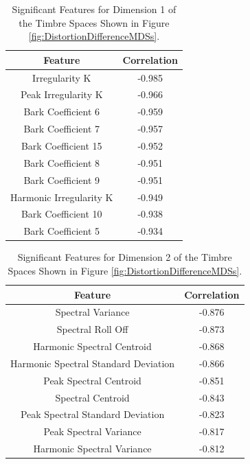	\begin{table}[h!]
		\centering
		\begin{tabular}{|c|c|}
			\hline
			\bf{Feature} & \bf{Correlation} \\
			\hline
			\hline
			Irregularity K & -0.985 \\
			\hline
			Peak Irregularity K & -0.966 \\
			\hline
			Bark Coefficient 6 & -0.959 \\
			\hline
			Bark Coefficient 7 & -0.957 \\
			\hline
			Bark Coefficient 15 & -0.952 \\
			\hline
			Bark Coefficient 8 & -0.951 \\
			\hline
			Bark Coefficient 9 & -0.951 \\
			\hline
			Harmonic Irregularity K & -0.949 \\
			\hline
			Bark Coefficient 10 & -0.938 \\
			\hline
			Bark Coefficient 5 & -0.934 \\
			\hline
		\end{tabular}
		\caption{Significant Features for Dimension 1 of the Timbre Spaces Shown in Figure 
			 \ref{fig:DistortionDifferenceMDSs}.}
		\label{tab:DistortionDifferenceFeatures}
	\end{table}

	\begin{table}[h!]
		\centering
		\begin{tabular}{|c|c|}
			\hline
			\bf{Feature} & \bf{Correlation} \\
			\hline
			\hline
			Spectral Variance & -0.876 \\
			\hline
			Spectral Roll Off & -0.873 \\
			\hline
			Harmonic Spectral Centroid & -0.868 \\
			\hline
			Harmonic Spectral Standard Deviation & -0.866 \\
			\hline
			Peak Spectral Centroid & -0.851 \\
			\hline
			Spectral Centroid & -0.843 \\
			\hline
			Peak Spectral Standard Deviation & -0.823 \\
			\hline
			Peak Spectral Variance & -0.817 \\
			\hline
			Harmonic Spectral Variance & -0.812 \\
			\hline
		\end{tabular}
		\caption{Significant Features for Dimension 2 of the Timbre Spaces Shown in Figure 
			 \ref{fig:DistortionDifferenceMDSs}.}
		\label{tab:DistortionDifferenceFeatures}
	\end{table}

